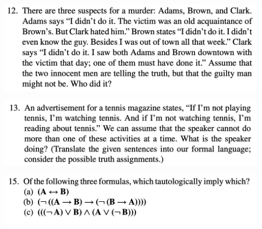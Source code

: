 \includegraphics[width=400pt]{img/logic--berkeley-125a--homework-1-2358.png}


\includegraphics[width=400pt]{img/logic--berkeley-125a--homework-1-526e.png}

\includegraphics[width=400pt]{img/logic--berkeley-125a--homework-1-a71f.png}
